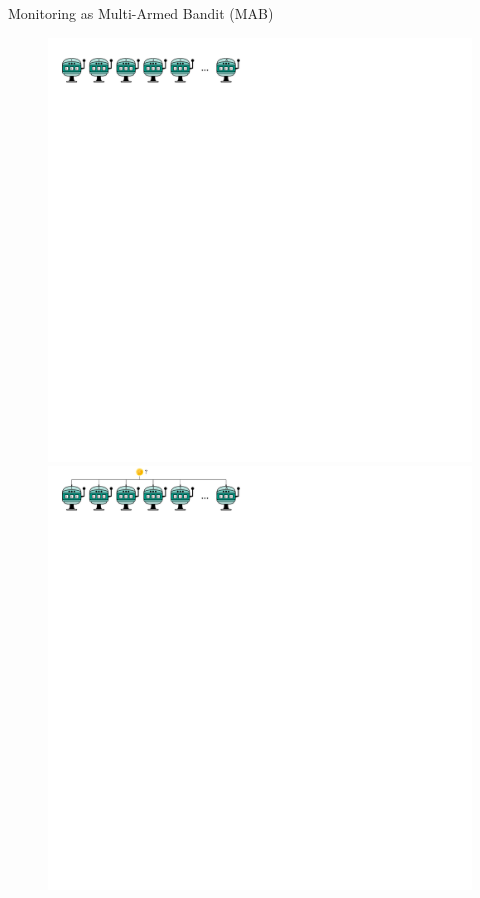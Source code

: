 \documentclass[16pt,usenames,dvipsnames, notheorems]{beamer}
\theoremstyle{definition}
\theoremstyle{example}
\theoremstyle{plain}
\begin{document}
\begin{frame}{Monitoring as Multi-Armed Bandit (MAB)}

\begin{figure}
	\centering
	\begin{overprint}
	\includegraphics[width=1\linewidth]{figures/bandit_1tok_big_alice_3-compressed.pdf}
		\onslide<2>
	\includegraphics[width=1\linewidth]{figures/bandit_1tok_big_alice_2-compressed.pdf}

\end{overprint}
\end{figure}
\end{frame}
\end{document}
